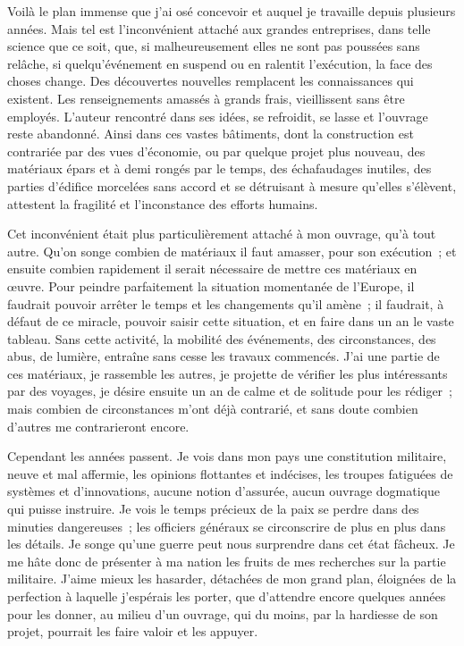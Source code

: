 \documentclass[french,twoside]{book} %
\begin{document}
Voilà le plan immense que j’ai osé concevoir et auquel je travaille depuis plusieurs années. Mais tel est l’inconvénient attaché aux grandes entreprises, dans telle science que ce soit, que, si malheureusement elles ne sont pas poussées sans relâche, si quelqu’événement en suspend ou en ralentit l’exécution, la face des choses change. Des découvertes nouvelles remplacent les connaissances qui existent. Les renseignements amassés à grands frais, vieillissent sans être employés. L’auteur rencontré dans ses idées, se refroidit, se lasse et l’ouvrage reste abandonné. Ainsi dans ces vastes bâtiments, dont la construction est contrariée par des vues d’économie, ou par quelque projet plus nouveau, des matériaux épars et à demi rongés par le temps, des échafaudages inutiles, des parties d’édifice morcelées sans accord et se détruisant à mesure qu’elles s’élèvent, attestent la fragilité et l’inconstance des efforts humains.\par
Cet inconvénient était plus particulièrement attaché à mon ouvrage, qu’à tout autre. Qu’on songe combien de matériaux il faut amasser, pour son exécution ; et ensuite combien rapidement il serait nécessaire de mettre ces matériaux en œuvre. Pour peindre parfaitement la situation momentanée de l’Europe, il faudrait pouvoir arrêter le temps et les changements qu’il amène ; il faudrait, à défaut de ce miracle, pouvoir saisir cette situation, et en faire dans un an le vaste tableau. Sans cette activité, la mobilité des événements, des circonstances, des abus, de lumière, entraîne sans cesse les travaux commencés. J’ai une partie de ces matériaux, je rassemble les autres, je projette de vérifier les plus intéressants par des voyages, je désire ensuite un an de calme et de solitude pour les rédiger ; mais combien de circonstances m’ont déjà contrarié, et sans doute combien d’autres me contrarieront encore.\par
Cependant les années passent. Je vois dans mon pays une constitution militaire, neuve et mal affermie, les opinions flottantes et indécises, les troupes fatiguées de systèmes et d’innovations, aucune notion d’assurée, aucun ouvrage dogmatique qui puisse instruire. Je vois le temps précieux de la paix se perdre dans des minuties dangereuses ; les officiers généraux se circonscrire de plus en plus dans les détails. Je songe qu’une guerre peut nous surprendre dans cet état fâcheux. Je me hâte donc de présenter à ma nation les fruits de mes recherches sur la partie militaire. J’aime mieux les hasarder, détachées de mon grand plan, éloignées de la perfection à laquelle j’espérais les porter, que d’attendre encore quelques années pour les donner, au milieu d’un ouvrage, qui du moins, par la hardiesse de son projet, pourrait les faire valoir et les appuyer.\par
\end{document}
